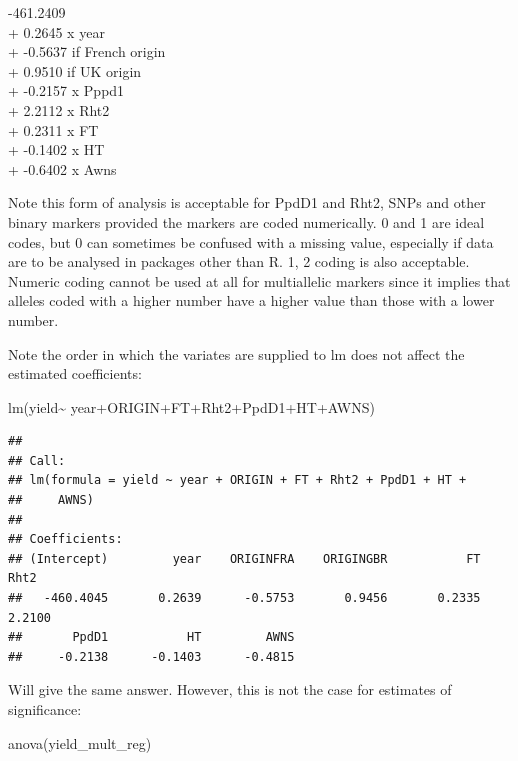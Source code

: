 \documentclass[
]{book}
\newenvironment{Shaded}{\begin{snugshade}}{\end{snugshade}}
\newcommand{\FunctionTok}[1]{\textcolor[rgb]{0.00,0.00,0.00}{#1}}
\newcommand{\NormalTok}[1]{#1}
\newcommand{\SpecialCharTok}[1]{\textcolor[rgb]{0.00,0.00,0.00}{#1}}
\begin{document}
-461.2409\\
+ 0.2645 x year\\
+ -0.5637 if French origin\\
+ 0.9510 if UK origin\\
+ -0.2157 x Pppd1\\
+ 2.2112 x Rht2\\
+ 0.2311 x FT\\
+ -0.1402 x HT\\
+ -0.6402 x Awns

Note this form of analysis is acceptable for PpdD1 and Rht2, SNPs and other binary markers provided the markers are coded numerically. 0 and 1 are ideal codes, but 0 can sometimes be confused with a missing value, especially if data are to be analysed in packages other than R. 1, 2 coding is also acceptable. Numeric coding cannot be used at all for multiallelic markers since it implies that alleles coded with a higher number have a higher value than those with a lower number.

Note the order in which the variates are supplied to lm does not affect the estimated coefficients:

\begin{Shaded}
\begin{Highlighting}[]
\FunctionTok{lm}\NormalTok{(yield}\SpecialCharTok{\textasciitilde{}}\NormalTok{ year}\SpecialCharTok{+}\NormalTok{ORIGIN}\SpecialCharTok{+}\NormalTok{FT}\SpecialCharTok{+}\NormalTok{Rht2}\SpecialCharTok{+}\NormalTok{PpdD1}\SpecialCharTok{+}\NormalTok{HT}\SpecialCharTok{+}\NormalTok{AWNS)}
\end{Highlighting}
\end{Shaded}

\begin{verbatim}
## 
## Call:
## lm(formula = yield ~ year + ORIGIN + FT + Rht2 + PpdD1 + HT + 
##     AWNS)
## 
## Coefficients:
## (Intercept)         year    ORIGINFRA    ORIGINGBR           FT         Rht2  
##   -460.4045       0.2639      -0.5753       0.9456       0.2335       2.2100  
##       PpdD1           HT         AWNS  
##     -0.2138      -0.1403      -0.4815
\end{verbatim}

Will give the same answer. However, this is not the case for estimates of significance:

\begin{Shaded}
\begin{Highlighting}[]
\FunctionTok{anova}\NormalTok{(yield\_mult\_reg)}
\end{Highlighting}
\end{Shaded}
\end{document}
